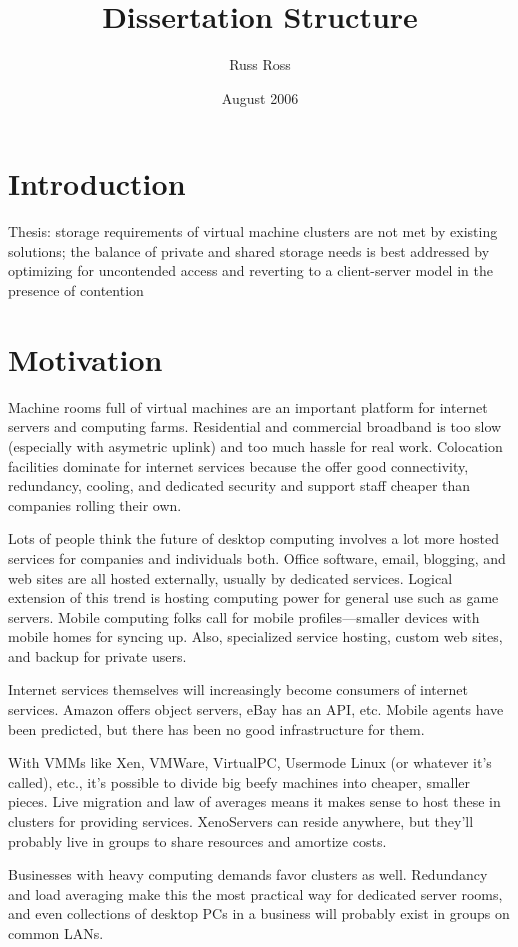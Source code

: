 \documentclass[a4paper,12pt]{article}
\title{Dissertation Structure}
\author{Russ Ross}
\date{August 2006}
\begin{document}
\maketitle

\section{Introduction}
Thesis: storage requirements \cite{warfield} of virtual machine clusters are not met by existing solutions; the balance of private and shared storage needs is best addressed by optimizing for uncontended access and reverting to a client-server model in the presence of contention

\section{Motivation}
Machine rooms full of virtual machines are an important platform for internet servers and computing farms. Residential and commercial broadband is too slow (especially with asymetric uplink) and too much hassle for real work. Colocation facilities dominate for internet services because the offer good connectivity, redundancy, cooling, and dedicated security and support staff cheaper than companies rolling their own.

Lots of people think the future of desktop computing involves a lot more hosted services for companies and individuals both. Office software, email, blogging, and web sites are all hosted externally, usually by dedicated services. Logical extension of this trend is hosting computing power for general use such as game servers. Mobile computing folks call for mobile profiles---smaller devices with mobile homes for syncing up. Also, specialized service hosting, custom web sites, and backup for private users.

Internet services themselves will increasingly become consumers of internet services. Amazon offers object servers, eBay has an API, etc. Mobile agents have been predicted, but there has been no good infrastructure for them.

With VMMs like Xen, VMWare, VirtualPC, Usermode Linux (or whatever it's called), etc., it's possible to divide big beefy machines into cheaper, smaller pieces. Live migration and law of averages means it makes sense to host these in clusters for providing services. XenoServers can reside anywhere, but they'll probably live in groups to share resources and amortize costs.

Businesses with heavy computing demands favor clusters as well. Redundancy and load averaging make this the most practical way for dedicated server rooms, and even collections of desktop PCs in a business will probably exist in groups on common LANs.
\end{document}
